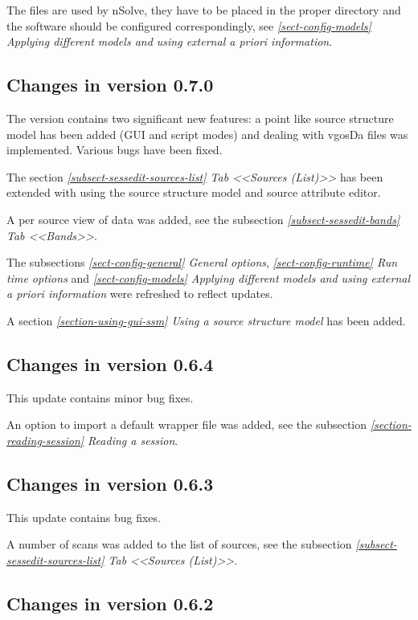 \documentclass [10pt,letterpaper]{report}
\newcommand{\nuSolve}{\greektext n\latintext Solve}
\begin{document}
{The files are used by \nuSolve{}, they have to be placed in the proper directory and
the software should be configured correspondingly, see
\emph{\ref{sect-config-models} Applying different models and using external a priori information}.


\subsection{Changes in version 0.7.0}

The version contains two significant new features: a point like source structure
model has been added (GUI and script modes) and dealing with vgosDa files was
implemented. Various bugs have been fixed.

The section \emph{\ref{subsect-sessedit-sources-list} Tab <<Sources (List)>>}
has been extended with using the source structure model and source attribute editor.

A per source view of data was added, see the subsection
\emph{\ref{subsect-sessedit-bands} Tab <<Bands>>}.

The subsections \emph{\ref{sect-config-general} General options},
\emph{\ref{sect-config-runtime} Run time options}
and \emph{\ref{sect-config-models} Applying different models and using
external a priori information} were refreshed to reflect updates.

A section \emph{\ref{section-using-gui-ssm} Using a source structure model}
has been added.


\subsection{Changes in version 0.6.4}

This update contains minor bug fixes.

An option to import a default wrapper file was added, see the subsection
\emph{\ref{section-reading-session} Reading a session}.


\subsection{Changes in version 0.6.3}

This update contains bug fixes.

A number of scans was added to the list of sources, see the subsection
\emph{\ref{subsect-sessedit-sources-list} Tab <<Sources (List)>>}.


\subsection{Changes in version 0.6.2}

}
\end{document}
